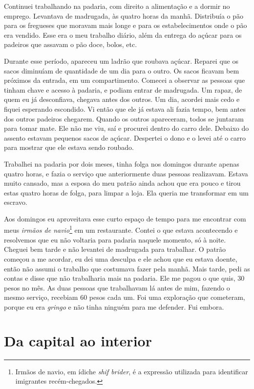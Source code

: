 Continuei trabalhando na padaria, com direito a
alimentação e a dormir no emprego. Levantava de madrugada, às quatro
horas da manhã. Distribuía o pão para os fregueses que moravam mais longe e para os
estabelecimentos onde o pão era vendido. Esse era o meu trabalho diário, 
além da entrega do açúcar para os padeiros que assavam o pão doce,
bolos, etc.

Durante esse período, apareceu um ladrão que roubava açúcar. Reparei que os sacos diminuíam de quantidade de um dia para o outro. Os sacos ficavam bem próximos da entrada, em um compartimento. Comecei a observar as pessoas que tinham chave e acesso à padaria, e podiam entrar de madrugada. Um rapaz, de quem eu já desconfiava, chegava antes dos outros. Um dia, acordei mais cedo e fiquei esperando escondido. Vi então que ele já estava ali fazia tempo, bem antes dos outros padeiros chegarem. Quando os outros apareceram, todos se juntaram para tomar mate. Ele não me viu, saí e procurei dentro do carro dele. Debaixo do assento estavam pequenos sacos de açúcar. Despertei o dono e o levei até o carro para mostrar que ele estava sendo roubado.

Trabalhei na padaria por dois meses, tinha folga nos domingos durante apenas quatro
horas, e fazia o serviço que anteriormente duas pessoas realizavam. Estava
muito cansado, mas a esposa do meu patrão ainda achou que era pouco e
tirou estas quatro horas de folga, para limpar a loja. Ela
queria me transformar em um escravo.

Aos domingos eu aproveitava esse curto espaço de tempo para me encontrar
com meus \textit{irmãos de navio}\footnote{Irmãos de navio, em ídiche \textit{shif brider}, é a expressão utilizada para identificar imigrantes recém-chegados.} em um restaurante. Contei o que estava
acontecendo e resolvemos que eu não voltaria para padaria naquele
momento, só à noite. Cheguei bem tarde e não levantei de madrugada para
trabalhar. O patrão começou a me acordar, eu dei uma desculpa e ele
achou que eu estava doente, então não assumi o trabalho que costumava fazer
pela manhã. Mais tarde, pedi as contas e disse que não trabalharia mais na
padaria. Ele me pagou o que quis, 30 pesos no mês. As duas pessoas que
trabalhavam lá antes de mim, fazendo o mesmo serviço, recebiam 60 pesos cada um. Foi uma
exploração que cometeram, porque eu era \textit{gringo} e não tinha ninguém
para me defender. Fui embora.

\chapter{Da capital ao interior}

